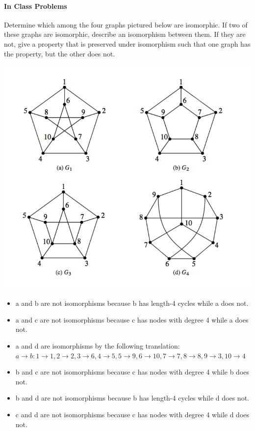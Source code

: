 \documentclass[solution, letterpaper]{cs20inclass}
\begin{document}
\paragraph*{In Class Problems}

\problem Determine which among the four graphs pictured below are isomorphic. If two of these graphs are isomorphic, describe an isomorphism between them. If they are not, give a property that is preserved under isomorphism such that one graph has the property, but the other does not.
\begin{center}
\includegraphics[scale=0.5]{isomorphisms_4.png}
\end{center}

\solution
\begin{itemize}
\item[] a and b are not isomorphisms because b has length-4 cycles while a does not.
\item[] a and c are not isomorphisms because c has nodes with degree 4 while a does not.
\item[] a and d are isomorphisms by the following translation: $a \rightarrow b: 1 \rightarrow 1, 2 \rightarrow 2, 3 \rightarrow 6, 4 \rightarrow 5, 5 \rightarrow 9, 6 \rightarrow 10, 7 \rightarrow 7, 8 \rightarrow 8, 9 \rightarrow 3, 10 \rightarrow 4$
\item[] b and c are not isomorphisms because c has nodes with degree 4 while b does not.
\item[] b and d are not isomorphisms because b has length-4 cycles while d does not.
\item[] c and d are not isomorphisms because c has nodes with degree 4 while d does not.
\end{itemize}
\end{document}
